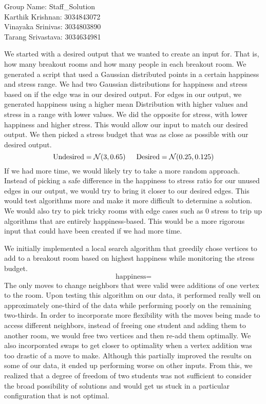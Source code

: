 \documentclass[11pt]{article}
\begin{document}
    Group Name: Staff\_Solution \\
    Karthik Krishnan: 3034843072 \\
    Vinayaka Srinivas: 3034803890 \\
    Tarang Srivastava: 3034634981


    We started with a desired output that we wanted to create an input for. That is, how many breakout rooms and how many people in each breakout room. We generated a script that used a Gaussian distributed points in a certain happiness and stress range. We had two Gaussian distributions for happiness and stress based on if the edge was in our desired output. For edges in our output, we generated happiness using a higher mean Distribution with higher values and stress in a range with lower values. We did the opposite for stress, with lower happiness and higher stress. This would allow our input to match our desired output. We then picked a stress budget that was as close as possible with our desired output. 
    $$ \text{Undesired} = \mathcal{N}(3, 0.65) \indent \text{Desired} = \mathcal{N}(0.25, 0.125)$$
    If we had more time, we would likely try to take a more random approach. Instead of picking a safe difference in the happiness to stress ratio for our unused edges in our output, we would try to bring it closer to our desired edges. This would test algorithms more and make it more difficult to determine a solution. We would also try to pick tricky rooms with edge cases such as 0 stress to trip up algorithms that are entirely happiness-based. This would be a more rigorous input that could have been created if we had more time.


    We initially implemented a local search algorithm that greedily chose vertices to add to a breakout room based on highest happiness while monitoring the stress budget. 
    $$ \text{happiness} = $$
    The only moves to change neighbors that were valid were additions of one vertex to the room. Upon testing this algorithm on our data, it performed really well on approximately one-third of the data while performing poorly on the remaining two-thirds. In order to incorporate more flexibility with the moves being made to access different neighbors, instead of freeing one student and adding them to another room, we would free two vertices and then re-add them optimally. We also incorporated swaps to get closer to optimality when a vertex addition was too drastic of a move to make. Although this partially improved the results on some of our data,  it ended up performing worse on other inputs. From this, we realized that a degree of freedom of two students was not sufficient to consider the broad possibility of solutions and would get us stuck in a particular configuration that is not optimal. 
\end{document}
